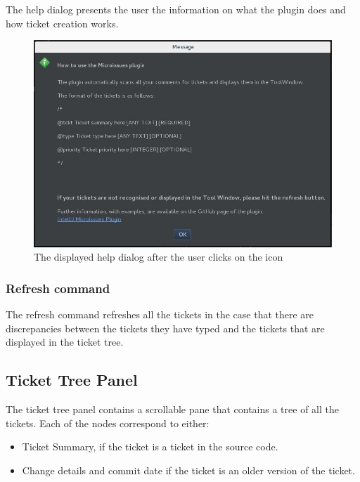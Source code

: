\documentclass{4thYearProject}
\begin{document}
The help dialog presents the user the information on what the plugin does and how ticket creation works. 

\begin{figure}[H]
\includegraphics[scale=0.6]{HelpDialog}
\centering
\caption{The displayed help dialog after the user clicks on the icon}\label{helpdialog}
\label{fig:helpdialog}
\end{figure}


\subsubsection{Refresh command}

The refresh command refreshes all the tickets in the case that there are discrepancies between the tickets they have typed and the tickets that are displayed in the ticket tree.

\subsection{Ticket Tree Panel}

The ticket tree panel contains a scrollable pane that contains a tree of all the tickets. Each of the nodes correspond to either:
\begin{itemize}
\item Ticket Summary, if the ticket is a ticket in the source code. 
\item Change details and commit date if the ticket is an older version of the ticket. 
\end{itemize}

\end{document}
